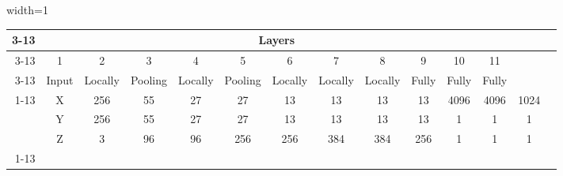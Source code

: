 \thispagestyle{lscapedlee}
\begin{landscape}
  \centering
  \begin{figure}[!htbp]
      \centering
      \vspace{5mm}
      \captionsetup{justification=centering}
      \begin{minipage}{0.95\linewidth}
        \centering
        \captionsetup{justification=centering, skip=9pt}
        \begin{adjustbox}{width=1\linewidth}
          \begin{tabular}{|r|c|c|c|c|c|c|c|c|c|c|c|c|c}\cline{3-13}
             \multicolumn{2}{c|}  {\multirow{2}{*}{}}    & \multicolumn{11}{c|}{Layers}    \\\cline{3-13}
             \multicolumn{2}{c|}{}                       &  1 & 2 & 3 & 4 & 5 & 6 & 7 & 8 & 9 & 10 & 11  \\\cline{3-13} \cline{1-13}
             \multicolumn{2}{|r|}{Type}                  &  Input          & Locally      & Pooling           & Locally             & Pooling             & Locally             & Locally             & Locally             &  Fully              &  Fully                 &  Fully         &                                    \\\cline{1-13}
             \multirow{3}{*}{Dimensions}               &X& \num{       256}& \num{     55}& \num{    27}      & \num{     27}       & \num{     13}       & \num{     13}       & \num{     13}       & \num{     13}       & \num{      4096}    & \num{     4096}        & \num{    1024} &                                    \\
                                                       &Y& \num{       256}& \num{     55}& \num{    27}      & \num{     27}       & \num{     13}       & \num{     13}       & \num{     13}       & \num{     13}       & \num{         1}    & \num{        1}        & \num{       1} &                                    \\
                                                       &Z& \num{         3}& \num{     96}& \num{    96}      & \num{    256}       & \num{    256}       & \num{    384}       & \num{    384}       & \num{    256}       & \num{         1}    & \num{        1}        & \num{       1} &                                    \\\cline{1-13}

\end{tabular}
\end{adjustbox}
\end{minipage}
\end{figure}
\end{landscape}
